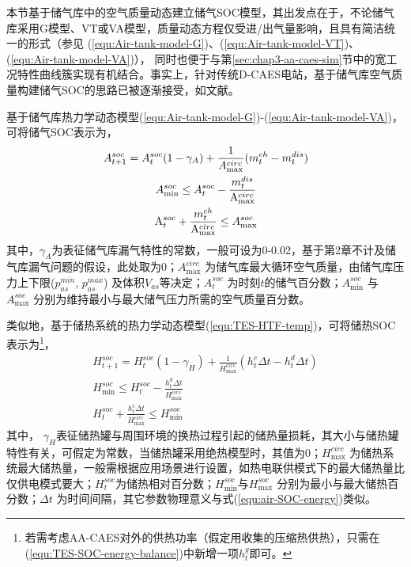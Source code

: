 本节基于储气库中的空气质量动态建立储气SOC模型，其出发点在于，不论储气库采用G模型、VT或VA模型，质量动态方程仅受进/出气量影响，且具有简洁统一的形式（参见
(\ref{equ:Air-tank-model-G})、(\ref{equ:Air-tank-model-VT})、(\ref{equ:Air-tank-model-VA})），%
同时也便于与第\ref{sec:chap3-aa-caes-sim}节中的宽工况特性曲线簇实现有机结合。事实上，针对传统D-CAES电站，基于储气库空气质量构建储气SOC的思路已被逐渐接受，如文献。

基于储气库热力学动态模型(\ref{equ:Air-tank-model-G})-(\ref{equ:Air-tank-model-VA})，可将储气SOC表示为，
\begin{subequations}
\label{equ:air-SOC-energy}
\begin{gather}
A_{t + 1}^{soc} = A_t^{soc}(1-\gamma_{A}) + \frac{1}{{{A_{\max}^{circ}}}}({m_t^{ch} - m_t^{dis}})\label{equ:air-SOC-energy-balance}\\
A_{\min }^{soc} \le A_t^{soc} - \frac{{m_t^{dis}}}{{{{\rm{A}}_{\max }^{circ}}}}\\
{\rm{A}}_t^{soc} + \frac{{m_t^{ch}}}{{{{\rm{A}}_{\max }^{circ}}}} \le A_{\max }^{soc}
\end{gather}
\end{subequations}
其中，$\gamma_{A}$为表征储气库漏气特性的常数，一般可设为0-0.02，基于第2章不计及储气库漏气问题的假设，此处取为0；${A_{\max}^{circ}}$ 为储气库最大循环空气质量，由储气库压力上下限($p_{as}^{min}$, $p_{as}^{max}$) 及体积$V_{as}$等决定；${{A}}_t^{soc}$ 为时刻$t$的储气百分数；${{A}}_{\min }^{soc}$ 与 ${{A}}_{\max }^{soc}$ 分别为维持最小与最大储气压力所需的空气质量百分数。

类似地，基于储热系统的热力学动态模型(\ref{equ:TES-HTF-temp})，可将储热SOC表示为\footnote{若需考虑AA-CAES对外的供热功率（假定用收集的压缩热供热），只需在(\ref{equ:TES-SOC-energy-balance})中新增一项$h_t^{g}$即可。}，
\begin{subequations}
\label{equ:TES-SOC-energy}
\begin{gather}
H_{t + 1}^{soc} = H_t^{soc}(1-\gamma_{H}) + \frac{1}{{{H_{\max}^{circ}}}}({h_t^c\Delta t - h_t^d\Delta t})\label{equ:TES-SOC-energy-balance}\\
H_{\min }^{soc} \le H_t^{soc} - \frac{{h_t^d\Delta t}}{{{H_{\max }^{circ}}}}\\
H_t^{soc} + \frac{{h_t^c\Delta t}}{{{H_{\max }^{circ}}}} \le H_{\min }^{soc}
\end{gather}
\end{subequations}
其中， $\gamma_{H}$表征储热罐与周围环境的换热过程引起的储热量损耗，其大小与储热罐特性有关，可假定为常数，当储热罐采用绝热模型时，其值为0；${H_{\max}^{circ}}$ 为储热系统最大储热量，一般需根据应用场景进行设置，如热电联供模式下的最大储热量比仅供电模式要大；$H_t^{soc}$为储热相对百分数；${{H}}_{\min }^{soc}$与${{H}}_{\max }^{soc}$ 分别为最小与最大储热百分数；$\Delta t$ 为时间间隔，其它参数物理意义与式(\ref{equ:air-SOC-energy})类似。

